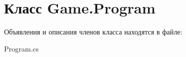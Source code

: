 \hypertarget{class_game_1_1_program}{}\section{Класс Game.\+Program}
\label{class_game_1_1_program}


Объявления и описания членов класса находятся в файле\+:\begin{DoxyCompactItemize}
\item 
Program.\+cs\end{DoxyCompactItemize}
